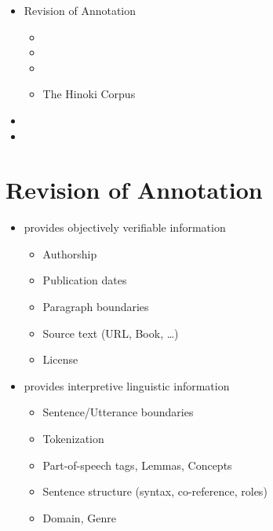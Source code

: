\documentclass[a4paper,landscape,headrule,footrule,dvips]{foils}
\begin{document}
\begin{CJK}{UTF8}{min}

\maketitle



\begin{itemize} 
\item Revision of Annotation
  \begin{itemize}
  \item {}
  \item {}
  \item {}
  \item The Hinoki Corpus
  \end{itemize}
\item {}
\item {}
\end{itemize}



\section{Revision of Annotation}

  \begin{itemize}
  \item {} provides objectively verifiable information
    \begin{itemize}
    \item Authorship
    \item Publication dates
    \item Paragraph boundaries
    \item Source text (URL, Book, \ldots)
    \item License
    \end{itemize}
  \item {} provides interpretive linguistic information
    \begin{itemize}
    \item Sentence/Utterance boundaries
    \item Tokenization
    \item Part-of-speech tags, Lemmas, Concepts
    \item Sentence structure (syntax, co-reference, roles)
    \item Domain, Genre
    \end{itemize}
  \end{itemize}


\end{CJK}
\end{document}
